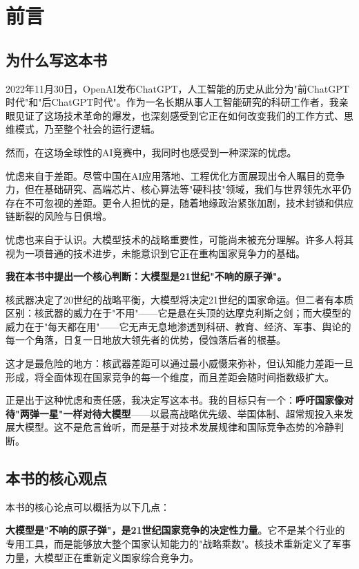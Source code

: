 \chapter*{前\quad 言}

\section*{为什么写这本书}

2022年11月30日，OpenAI发布ChatGPT，人工智能的历史从此分为"前ChatGPT时代"和"后ChatGPT时代"。作为一名长期从事人工智能研究的科研工作者，我亲眼见证了这场技术革命的爆发，也深刻感受到它正在如何改变我们的工作方式、思维模式，乃至整个社会的运行逻辑。

然而，在这场全球性的AI竞赛中，我同时也感受到一种深深的忧虑。

忧虑来自于差距。尽管中国在AI应用落地、工程优化方面展现出令人瞩目的竞争力，但在基础研究、高端芯片、核心算法等"硬科技"领域，我们与世界领先水平仍存在不可忽视的差距。更令人担忧的是，随着地缘政治紧张加剧，技术封锁和供应链断裂的风险与日俱增。

忧虑也来自于认识。大模型技术的战略重要性，可能尚未被充分理解。许多人将其视为一项普通的技术进步，未能意识到它正在重构国家竞争力的基础。

\textbf{我在本书中提出一个核心判断：大模型是21世纪"不响的原子弹"。}

核武器决定了20世纪的战略平衡，大模型将决定21世纪的国家命运。但二者有本质区别：核武器的威力在于"不用"——它是悬在头顶的达摩克利斯之剑；而大模型的威力在于"每天都在用"——它无声无息地渗透到科研、教育、经济、军事、舆论的每一个角落，日复一日地放大领先者的优势，侵蚀落后者的根基。

这才是最危险的地方：核武器差距可以通过最小威慑来弥补，但认知能力差距一旦形成，将全面体现在国家竞争的每一个维度，而且差距会随时间指数级扩大。

正是出于这种忧虑和责任感，我决定写这本书。我的目标只有一个：\textbf{呼吁国家像对待"两弹一星"一样对待大模型}——以最高战略优先级、举国体制、超常规投入来发展大模型。这不是危言耸听，而是基于对技术发展规律和国际竞争态势的冷静判断。

\section*{本书的核心观点}

本书的核心论点可以概括为以下几点：

\textbf{大模型是"不响的原子弹"，是21世纪国家竞争的决定性力量}。它不是某个行业的专用工具，而是能够放大整个国家认知能力的"战略乘数"。核技术重新定义了军事力量，大模型正在重新定义国家综合竞争力。

